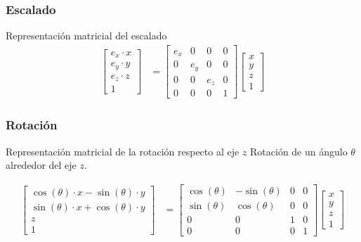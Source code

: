 \documentclass[a4paper, twoside]{article}
\begin{document}
\subsubsection{Escalado}
\begin{definicion*}{Representación matricial del escalado}
	\begin{align*}
		\begin{bmatrix}
			e_x \cdot x \\
			e_y \cdot y \\
			e_z \cdot z \\
			1
		\end{bmatrix} &=
		\begin{bmatrix}
			e_x & 0   & 0   & 0 \\
			0   & e_y & 0   & 0 \\
			0   & 0   & e_z & 0 \\
			0   & 0   & 0   & 1
		\end{bmatrix}
		\begin{bmatrix}
			x \\
			y \\
			z \\
			1
		\end{bmatrix}
	\end{align*}
\end{definicion*}

\subsubsection{Rotación}
\begin{definicion*}{Representación matricial de la rotación respecto al eje $z$}
	Rotación de un ángulo $\theta$ alrededor del eje $z$.

	\begin{align*}
		\begin{bmatrix}
			\cos(\theta) \cdot x - \sin(\theta) \cdot y \\
			\sin(\theta) \cdot x + \cos(\theta) \cdot y \\
			z \\
			1
		\end{bmatrix} &=
		\begin{bmatrix}
			\cos(\theta) & -\sin(\theta) & 0 & 0 \\
			\sin(\theta) & \cos(\theta)  & 0 & 0 \\
			0            & 0             & 1 & 0 \\
			0            & 0             & 0 & 1
		\end{bmatrix}
		\begin{bmatrix}
			x \\
			y \\
			z \\
			1
		\end{bmatrix}
	\end{align*}
\end{definicion*}
\end{document}
